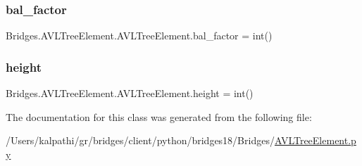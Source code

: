 \subsubsection{\texorpdfstring{bal\+\_\+factor}{bal\_factor}}
{\footnotesize\ttfamily Bridges.\+A\+V\+L\+Tree\+Element.\+A\+V\+L\+Tree\+Element.\+bal\+\_\+factor = int()\hspace{0.3cm}{\ttfamily [static]}}

\mbox{\label{class_bridges_1_1_a_v_l_tree_element_1_1_a_v_l_tree_element_af8856cd0f69c2299f293fe5c4891651f}} 
\subsubsection{\texorpdfstring{height}{height}}
{\footnotesize\ttfamily Bridges.\+A\+V\+L\+Tree\+Element.\+A\+V\+L\+Tree\+Element.\+height = int()\hspace{0.3cm}{\ttfamily [static]}}



The documentation for this class was generated from the following file\+:\begin{DoxyCompactItemize}
\item 
/\+Users/kalpathi/gr/bridges/client/python/bridges18/\+Bridges/\mbox{\hyperlink{_a_v_l_tree_element_8py}{A\+V\+L\+Tree\+Element.\+py}}\end{DoxyCompactItemize}
